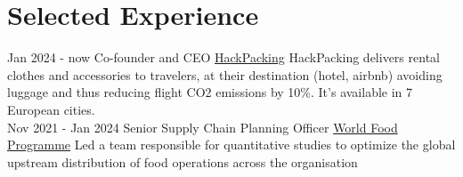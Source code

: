 \documentclass[letterpaper]{twentysecondcv} %
\begin{document}
\makeprofile %


\section{Selected Experience}

\begin{twenty} %
\twentyitem
      {Jan 2024 -}
    {now}
        {Co-founder and CEO}
        {\href{https://hack-packing.com/}{HackPacking}}
        {}
        {HackPacking delivers rental clothes and accessories to travelers, at their destination (hotel, airbnb) avoiding luggage and thus reducing flight CO2 emissions by 10\%. It's available in 7 European cities.
        }
        \\
\twentyitem
      {Nov 2021 -}
    {Jan 2024}
        {Senior Supply Chain Planning Officer}
        {\href{http://www.wfp.org/}{World Food Programme}}
        {}
        {Led a team responsible for quantitative studies to optimize the global upstream distribution of food operations across the organisation
        }
        \\

\end{twenty}
\end{document}
